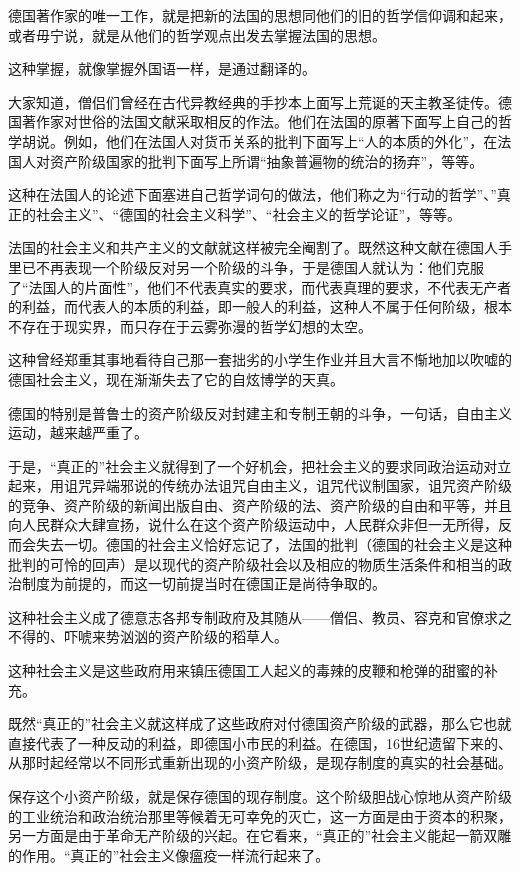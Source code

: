     德国著作家的唯一工作，就是把新的法国的思想同他们的旧的哲学信仰调和起来，或者毋宁说，就是从他们的哲学观点出发去掌握法国的思想。

    这种掌握，就像掌握外国语一样，是通过翻译的。

    大家知道，僧侣们曾经在古代异教经典的手抄本上面写上荒诞的天主教圣徒传。德国著作家对世俗的法国文献采取相反的作法。他们在法国的原著下面写上自己的哲学胡说。例如，他们在法国人对货币关系的批判下面写上“人的本质的外化”，在法国人对资产阶级国家的批判下面写上所谓“抽象普遍物的统治的扬弃”，等等。

    这种在法国人的论述下面塞进自己哲学词句的做法，他们称之为“行动的哲学”、”真正的社会主义”、“德国的社会主义科学”、“社会主义的哲学论证”，等等。

    法国的社会主义和共产主义的文献就这样被完全阉割了。既然这种文献在德国人手里已不再表现一个阶级反对另一个阶级的斗争，于是德国人就认为：他们克服了“法国人的片面性”，他们不代表真实的要求，而代表真理的要求，不代表无产者的利益，而代表人的本质的利益，即一般人的利益，这种人不属于任何阶级，根本不存在于现实界，而只存在于云雾弥漫的哲学幻想的太空。

    这种曾经郑重其事地看待自己那一套拙劣的小学生作业并且大言不惭地加以吹嘘的德国社会主义，现在渐渐失去了它的自炫博学的天真。

    德国的特别是普鲁士的资产阶级反对封建主和专制王朝的斗争，一句话，自由主义运动，越来越严重了。

    于是，“真正的”社会主义就得到了一个好机会，把社会主义的要求同政治运动对立起来，用诅咒异端邪说的传统办法诅咒自由主义，诅咒代议制国家，诅咒资产阶级的竞争、资产阶级的新闻出版自由、资产阶级的法、资产阶级的自由和平等，并且向人民群众大肆宣扬，说什么在这个资产阶级运动中，人民群众非但一无所得，反而会失去一切。德国的社会主义恰好忘记了，法国的批判（德国的社会主义是这种批判的可怜的回声）是以现代的资产阶级社会以及相应的物质生活条件和相当的政治制度为前提的，而这一切前提当时在德国正是尚待争取的。

    这种社会主义成了德意志各邦专制政府及其随从——僧侣、教员、容克和官僚求之不得的、吓唬来势汹汹的资产阶级的稻草人。

    这种社会主义是这些政府用来镇压德国工人起义的毒辣的皮鞭和枪弹的甜蜜的补充。

    既然“真正的”社会主义就这样成了这些政府对付德国资产阶级的武器，那么它也就直接代表了一种反动的利益，即德国小市民的利益。在德国，16世纪遗留下来的、从那时起经常以不同形式重新出现的小资产阶级，是现存制度的真实的社会基础。

    保存这个小资产阶级，就是保存德国的现存制度。这个阶级胆战心惊地从资产阶级的工业统治和政治统治那里等候着无可幸免的灭亡，这一方面是由于资本的积聚，另一方面是由于革命无产阶级的兴起。在它看来，“真正的”社会主义能起一箭双雕的作用。“真正的”社会主义像瘟疫一样流行起来了。

